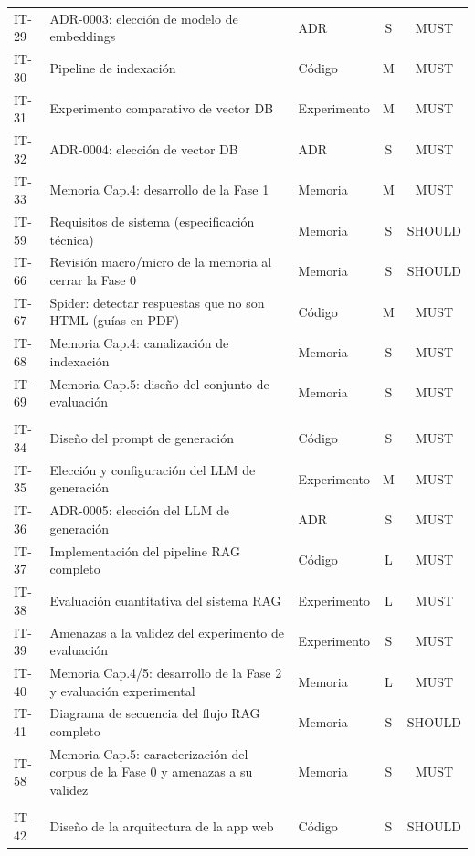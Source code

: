 \begin{xltabular}{\textwidth}{@{}l Y l c c@{}}
  IT-29 & ADR-0003: elección de modelo de embeddings & ADR & S & MUST \\
  IT-30 & Pipeline de indexación & Código & M & MUST \\
  IT-31 & Experimento comparativo de vector DB & Experimento & M & MUST \\
  IT-32 & ADR-0004: elección de vector DB & ADR & S & MUST \\
  IT-33 & Memoria Cap.4: desarrollo de la Fase 1 & Memoria & M & MUST \\
  IT-59 & Requisitos de sistema (especificación técnica) & Memoria & S & SHOULD \\
  IT-66 & Revisión macro/micro de la memoria al cerrar la Fase 0 & Memoria & S & SHOULD \\
  IT-67 & Spider: detectar respuestas que no son HTML (guías en PDF) & Código & M & MUST \\
  IT-68 & Memoria Cap.4: canalización de indexación & Memoria & S & MUST \\
  IT-69 & Memoria Cap.5: diseño del conjunto de evaluación & Memoria & S & MUST \\
  \addlinespace
   \\[2pt]
  IT-34 & Diseño del prompt de generación & Código & S & MUST \\
  IT-35 & Elección y configuración del LLM de generación & Experimento & M & MUST \\
  IT-36 & ADR-0005: elección del LLM de generación & ADR & S & MUST \\
  IT-37 & Implementación del pipeline RAG completo & Código & L & MUST \\
  IT-38 & Evaluación cuantitativa del sistema RAG & Experimento & L & MUST \\
  IT-39 & Amenazas a la validez del experimento de evaluación & Experimento & S & MUST \\
  IT-40 & Memoria Cap.4/5: desarrollo de la Fase 2 y evaluación experimental & Memoria & L & MUST \\
  IT-41 & Diagrama de secuencia del flujo RAG completo & Memoria & S & SHOULD \\
  IT-58 & Memoria Cap.5: caracterización del corpus de la Fase 0 y amenazas a su validez & Memoria & S & MUST \\
  \addlinespace
   \\[2pt]
  IT-42 & Diseño de la arquitectura de la app web & Código & S & SHOULD \\

\end{xltabular}
